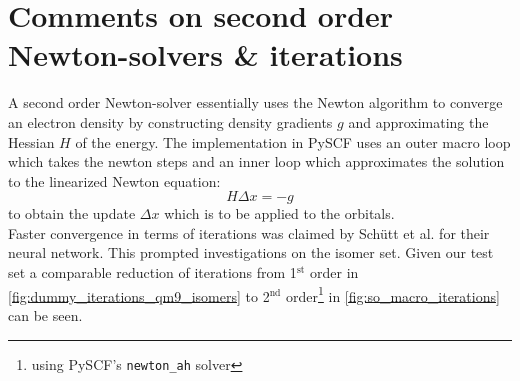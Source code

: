 \section{Comments on second order Newton-solvers \& iterations}
\label{sec:notes_on_so_newton}
A second order Newton-solver essentially uses the Newton algorithm to converge an electron density by constructing density gradients $g$ and approximating the Hessian $H$ of the energy. The implementation in PySCF uses an outer macro loop which takes the newton steps and an inner loop which approximates the solution to the linearized Newton equation:
\[H \Delta x = -g\]
to obtain the update $\Delta x$ which is to be applied to the orbitals.\\

Faster convergence in terms of iterations was claimed by Schütt et al. for their neural network. \parencite{ref:schuett_unifying_2019} This prompted investigations on the  isomer set. Given our test set a comparable reduction of iterations from 1$^\text{st}$ order in \autoref{fig:dummy_iterations_qm9_isomers} to 2$^\text{nd}$ order\footnote{using PySCF's \texttt{newton\_ah} solver} in \autoref{fig:so_macro_iterations} can be seen. 

